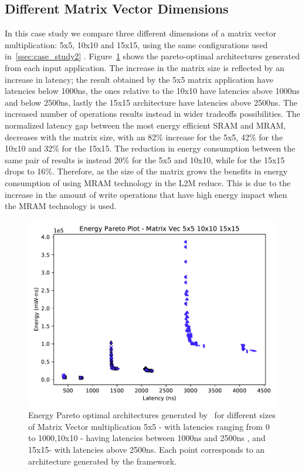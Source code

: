 \subsection{Different Matrix Vector Dimensions}
In this case study we compare three different dimensions of a matrix vector multiplication: 5x5, 10x10 and 15x15, using the same configurations used in~\ref{ssec:case_study2} . Figure~\ref{fig:sram_vs_mram_pareto_vec_sizes} shows the pareto-optimal architectures generated from each input application. The increase in the matrix size is reflected by an increase in latency; the result obtained by the 5x5 matrix application have latencies below 1000ns, the ones relative to the 10x10 have latencies above 1000ns and below 2500ns, lastly the 15x15 architecture have latencies above 2500ns. The increased number of operations results instead in wider tradeoffs possibilities. The normalized latency gap between the most energy efficient SRAM and MRAM, decreases with the matrix size, with an 82\% increase for the 5x5, 42\% for the 10x10 and 32\% for the 15x15. The reduction in energy consumption between the same pair of results is instead 20\% for the 5x5 and 10x10, while for the 15x15 drops to 16\%. Therefore, as the size of the matrix grows the benefits in energy consumption of using MRAM technology in the L2M reduce. This is due to the increase in the amount of write operations that have high energy impact when the MRAM technology is used. 

\begin{figure}[tb] 
\centering
\includegraphics[width=0.8\columnwidth]{graphs/EnergyParetoPlotMultipleSizeMAtrixVec.pdf}
    \caption{\small Energy Pareto optimal architectures generated by \frameworkname ~for different sizes of Matrix Vector multiplication 5x5 - with latencies ranging from 0 to 1000,10x10 - having latencies between 1000ns and 2500ns , and 15x15- with latencies above 2500ns. Each point corresponds to an architecture generated by the framework.}
\label{fig:sram_vs_mram_pareto_vec_sizes}
\end{figure}


